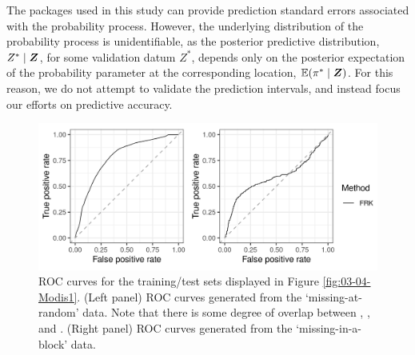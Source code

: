 \documentclass[article]{jss}
\def\mbf#1{{%
\mathchoice%
{\hbox{\boldmath$\displaystyle{#1}$}}%
{\hbox{\boldmath$\textstyle{#1}$}}%
{\hbox{\boldmath$\scriptstyle{#1}$}}%
{\hbox{\boldmath$\scriptscriptstyle{#1}$}}%
}}
\def\vec{\mbf}
\newcommand{\ENoLR}[1]{\mathbb{E}(#1)} %
\begin{document}
 
The packages used in this study can provide prediction standard errors associated with the probability process. 
However, the underlying distribution of the probability process is unidentifiable, as the posterior predictive distribution, ${Z^*} \mid \vec{Z}$, for some validation datum ${Z^*}$, depends only on the posterior expectation of the probability parameter at the corresponding location, $\ENoLR{\pi^* \mid \vec{Z}}$.
For this reason, we do not attempt to validate the prediction intervals, and instead focus our efforts on predictive accuracy.
\begin{figure}[t!]
    \centering
    \includegraphics[width = \linewidth]{img/MODIS_ROC.png}
    \caption{ROC curves for the training/test sets displayed in Figure \ref{fig:03-04-Modis1}. (Left panel) ROC curves generated from the `missing-at-random' data. Note that there is some degree of overlap between , , and . (Right panel) ROC curves generated from the `missing-in-a-block' data. } 
  \label{fig:MODIS:ROC}
\end{figure}
\end{document}
